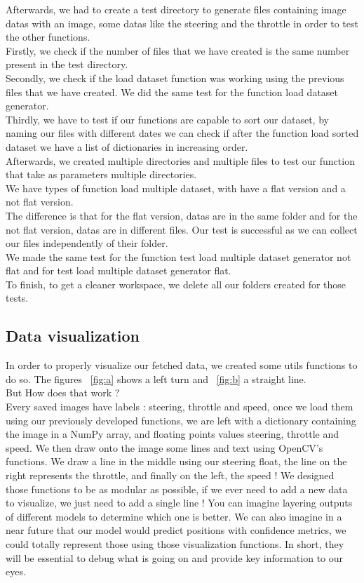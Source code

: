 \documentclass[12pt]{article}
\begin{document}
Afterwards, we had to create a test directory to generate files containing image datas with an image, some datas like the steering and the throttle in order to test the other functions. \\ 
Firstly, we check if the number of files that we have created is the same number present in the test directory. \\ 
Secondly, we check if the load dataset function was working using the previous files that we have created. We did the same test for the function load dataset generator. \\ 
Thirdly, we have to test if our functions are capable to sort our dataset, by naming our files with different dates we can check if after the function load sorted dataset we have a list of dictionaries in increasing order. \\ 
Afterwards, we created multiple directories and multiple files to test our function that take as parameters multiple directories. \\ 
We have types of function load multiple dataset, with have a flat version and a not flat version. \\ 
The difference is that for the flat version, datas are in the same folder and for the not flat version, datas are in different files. Our test is successful as we can collect our files independently of their folder. \\ 
We made the same test for the function test load multiple dataset generator not flat and for test load multiple dataset generator flat. \\ 
To finish, to get a cleaner workspace, we delete all our folders created for those tests. \\ 

\subsection{Data visualization}
In order to properly visualize our fetched data, we created some utils functions to do so.
The figures ~\ref{fig:a} shows a left turn and ~\ref{fig:b} a straight line. \\ But How does that work ? \\ Every saved images have labels : steering, throttle and speed, once we load them using our previously developed functions, we are left with a dictionary containing the image in a NumPy array, and floating points values steering, throttle and speed. We then draw onto the image some lines and text using OpenCV's functions. We draw a line in the middle using our steering float, the line on the right represents the throttle, and finally on the left, the speed ! We designed those functions to be as modular as possible, if we ever need to add a new data to visualize, we just need to add a single line ! You can imagine layering outputs of different models to determine which one is better. We can also imagine in a near future that our model would predict positions with confidence metrics, we could totally represent those using those visualization functions. In short, they will be essential to debug what is going on and provide key information to our eyes.
\end{document}
